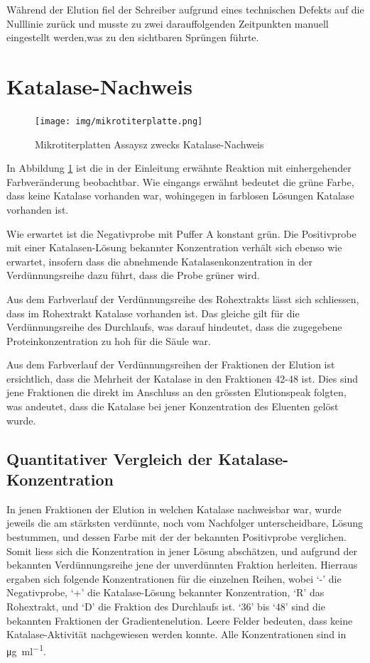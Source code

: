 \documentclass[a4paper,german]{scrreprt}
\begin{document}
Während der Elution fiel der Schreiber aufgrund eines technischen Defekts auf
die Nulllinie zurück und musste zu zwei darauffolgenden Zeitpunkten manuell
eingestellt werden,was zu den sichtbaren Sprüngen führte.

\section{Katalase-Nachweis}

\begin{figure}[h]
	\centering
	\texttt{[image: img/mikrotiterplatte.png]}
	\caption{Mikrotiterplatten Assaysz zwecks Katalase-Nachweis}
	\label{fig:katalase_nachweis}
\end{figure}

In Abbildung \ref{fig:katalase_nachweis} ist die in der Einleitung erwähnte
Reaktion mit einhergehender Farbveränderung beobachtbar. Wie eingangs erwähnt
bedeutet die grüne Farbe, dass keine Katalase vorhanden war, wohingegen in
farblosen Lösungen Katalase vorhanden ist.

Wie erwartet ist die Negativprobe mit Puffer A konstant grün. Die Positivprobe
mit einer Katalasen-Lösung bekannter Konzentration verhält sich ebenso wie
erwartet, insofern dass die abnehmende Katalasenkonzentration in der
Verdünnungsreihe dazu führt, dass die Probe grüner wird.

Aus dem Farbverlauf der Verdünnungsreihe des Rohextrakts lässt sich schliessen,
dass im Rohextrakt Katalase vorhanden ist. Das gleiche gilt für die
Verdünnungsreihe des Durchlaufs, was darauf hindeutet, dass die zugegebene
Proteinkonzentration zu hoh für die Säule war.

Aus dem Farbverlauf der Verdünnungsreihen der Fraktionen der Elution ist
ersichtlich, dass die Mehrheit der Katalase in den Fraktionen 42-48 ist. Dies
sind jene Fraktionen die direkt im Anschluss an den grössten Elutionspeak
folgten, was andeutet, dass die Katalase bei jener Konzentration des Eluenten
gelöst wurde.

\subsection{Quantitativer Vergleich der Katalase-Konzentration}

In jenen Fraktionen der Elution in welchen Katalase nachweisbar war, wurde
jeweils die am stärksten verdünnte, noch vom Nachfolger unterscheidbare, Lösung
bestummen, und dessen Farbe mit der der bekannten Positivprobe verglichen.
Somit liess sich die Konzentration in jener Lösung abschätzen, und aufgrund der
bekannten Verdünnungsreihe jene der unverdünnten Fraktion herleiten. Hierraus
ergaben sich folgende Konzentrationen für die einzelnen Reihen, wobei `-' die
Negativprobe, `+' die Katalase-Lösung bekannter Konzentration, `R' das
Rohextrakt, und `D' die Fraktion des Durchlaufs ist. `36' bis `48' sind die
bekannten Fraktionen der Gradientenelution. Leere Felder bedeuten, dass keine
Katalase-Aktivität nachgewiesen werden konnte. Alle Konzentrationen sind in
\si{\ug \per \ml}.
\\
\end{document}
